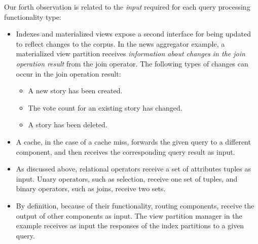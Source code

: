 \noindent
Our forth observation is related to the \textit{input} required for each query processing functionality type:
\begin{itemize}
  \item Indexes and materialized views expose a second interface for being updated to reflect changes to the corpus.
  In the news aggregator example, a materialized view partition receives \textit{information about changes in the join operation result}
  from the join operator.
  The following types of changes can occur in the join operation result:
  \begin{itemize}
    \item A new story has been created.
    \item The vote count for an existing story has changed.
    \item A story has been deleted.
  \end{itemize}


  \item A cache, in the case of a cache miss, forwards the given query to a different component,
  and then receives the corresponding query result as input.

  \item As discussed above, relational operators receive a set of attributes tuples as input.
  Unary operators, such as selection, receive one set of tuples,
  and binary operators, such as joins, receive two sets.

  \item By definition, because of their functionality, routing components, receive the output of other components as input.
  The view partition manager in the example receives as input the responses of the index partitions to a given query.
\end{itemize}

